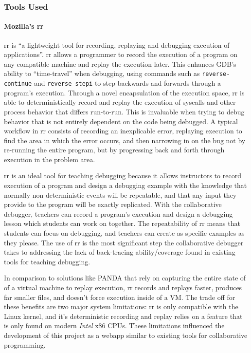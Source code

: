 \documentclass[12pt]{article}
\begin{document}
\subsubsection{Tools Used}

\paragraph{Mozilla's rr}\label{rr}

rr is ``a lightweight tool for recording, replaying and debugging
execution of applications''\cite{rr-repo}. rr allows a programmer to
record the execution of a program on any compatible machine and replay
the execution later.  This enhances GDB's ability to ``time-travel''
when debugging, using commands such as \lstinline{reverse-continue}
and \lstinline{reverse-stepi}\cite{gdbman} to step backwards and
forwards through a program's execution.  Through a novel encapsulation
of the execution space, rr is able to deterministically record and
replay the execution of syscalls and other process behavior that
differs run-to-run.  This is invaluable when trying to debug behavior
that is not entirely dependent on the code being debugged.  A typical
workflow in rr consists of recording an inexplicable error, replaying
execution to find the area in which the error occurs, and then
narrowing in on the bug not by re-running the entire program, but by
progressing back and forth through execution in the problem area.
\par

rr is an ideal tool for teaching debugging because it allows
instructors to record execution of a program and design a debugging
example with the knowledge that normally non-deterministic events will
be repeatable, and that any input they provide to the program will be
exactly replicated.  With the collaborative debugger, teachers can
record a program's execution and design a debugging lesson which
students can work on together.  The repeatability of rr means that
students can focus on debugging, and teachers can create as specific
examples as they please.  The use of rr is the most significant step
the collaborative debugger takes to addressing the lack of
back-tracing ability/coverage found in existing tools for teaching
debugging\cite{10.1145/3286960.3286970}.

In comparison to solutions like PANDA\cite{10.1145/2843859.2843867}
that rely on capturing the entire state of of a virtual machine to
replay execution, rr records and replays faster, produces far smaller
files, and doesn't force execution inside of a
VM.\cite{DBLP:journals/corr/OCallahanJFHNP17} The trade off for these
benefits are two major system limitations: rr is only compatible with
the Linux kernel, and it's deterministic recording and replay relies
on a feature that is only found on modern \textit{Intel} x86 CPUs.
These limitations influenced the development of this project as a
webapp similar to existing tools for collaborative programming.
\par
\end{document}
